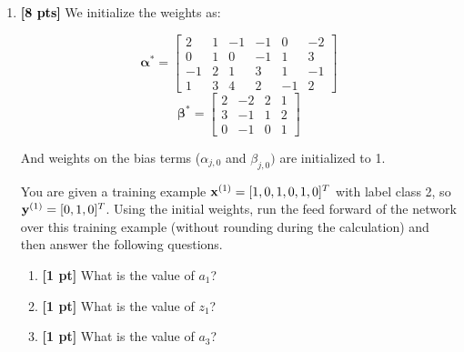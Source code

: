 \begin{enumerate}
\item \textcolor{black}{\textbf{[8 pts]}}
     We initialize the weights as:
\begin{center}
$$\boldsymbol{\alpha^*}=
    \begin{bmatrix}
    2 & 1 & -1 & -1 & 0 & -2 \\
    0 & 1 & 0 & -1 & 1 & 3 \\
    -1 & 2 & 1 & 3 & 1 & -1 \\
    1 & 3 & 4 & 2 & -1 & 2
    \end{bmatrix}$$
$$\boldsymbol{\beta^*}=
    \begin{bmatrix}
    2 & -2 & 2 & 1 \\
    3 & -1 & 1 & 2 \\
    0 & -1 & 0 & 1
    \end{bmatrix}
$$
\end{center}
    
And weights on the bias terms (${\alpha}_{j,0}$ and ${\beta}_{j,0})$ are initialized to 1.
    
    You are given a training example $\mathbf{x}^{(1)}=[1,0,1,0,1,0]^T$ with label class 2, so $\mathbf{y}^{(1)}=[0,1,0]^T$. Using the initial weights, run the feed forward of the network over this training example (without rounding during the calculation) and then answer the following questions. 
    
    \begin{enumerate}
        \item \textbf{[1 pt]} What is the value of $a_1$?
        
        \begin{tcolorbox}[fit,height=1cm, width=2cm, blank, borderline={1pt}{-2pt}]
        \end{tcolorbox}
        
        \item \textbf{[1 pt]} What is the value of $z_1$?
        
        \begin{tcolorbox}[fit,height=1cm, width=2cm, blank, borderline={1pt}{-2pt}]
        \end{tcolorbox}
        
        \item \textbf{[1 pt]} What is the value of $a_3$?
        
        \begin{tcolorbox}[fit,height=1cm, width=2cm, blank, borderline={1pt}{-2pt}]
        \end{tcolorbox}
        

\end{enumerate}
\end{enumerate}
